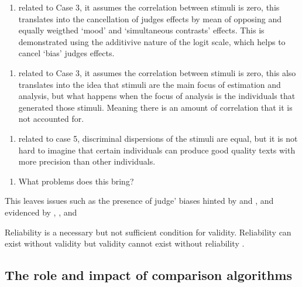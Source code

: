 \documentclass[
  authoryear,
  preprint,
  1p]{elsarticle}
\providecommand{\tightlist}{%
  \setlength{\itemsep}{0pt}\setlength{\parskip}{0pt}}\usepackage{longtable,booktabs,array}
\begin{document}
\begin{enumerate}
\def\labelenumi{(\alph{enumi})}
\tightlist
\item
  related to Case 3, it assumes the correlation between stimuli is zero,
  this translates into the cancellation of judges effects by mean of
  opposing and equally weigthed `mood' and `simultaneous contrasts'
  effects. This is demonstrated using the additivive nature of the logit
  scale, which helps to cancel `bias' judges effects.
\end{enumerate}

\begin{enumerate}
\def\labelenumi{(\alph{enumi})}
\setcounter{enumi}{1}
\tightlist
\item
  related to Case 3, it assumes the correlation between stimuli is zero,
  this also translates into the idea that stimuli are the main focus of
  estimation and analysis, but what happens when the focus of analysis
  is the individuals that generated those stimuli. Meaning there is an
  amount of correlation that it is not accounted for.
\end{enumerate}

\begin{enumerate}
\def\labelenumi{(\alph{enumi})}
\setcounter{enumi}{2}
\tightlist
\item
  related to case 5, discriminal dispersions of the stimuli are equal,
  but it is not hard to imagine that certain individuals can produce
  good quality texts with more precision than other individuals.
\end{enumerate}

\begin{enumerate}
\def\labelenumi{\arabic{enumi}.}
\setcounter{enumi}{2}
\tightlist
\item
  What problems does this bring?
\end{enumerate}

This leaves issues such as the presence of judge' biases hinted by
\citet{Bramley_2008} and \citet{Kelly_et_al_2022}, and evidenced by
\citet{Pollitt_et_al_2003}, \citet{Arlett_2003}, and
\citet{Guthrie_2003}

{Reliability is a necessary but not sufficient condition for validity.
Reliability can exist without validity but validity cannot exist without
reliability \citep{Perron_et_al_2015}}.

\subsection{The role and impact of comparison
algorithms}\label{the-role-and-impact-of-comparison-algorithms}
\end{document}
